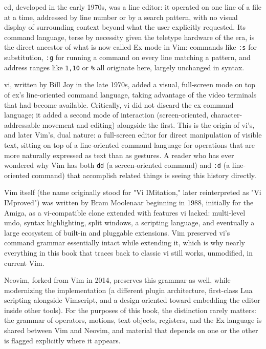 ed, developed in the early 1970s, was a line editor: it operated on one line of a file at a time, addressed by line number or by a search pattern, with no visual display of surrounding context beyond what the user explicitly requested. Its command language, terse by necessity given the teletype hardware of the era, is the direct ancestor of what is now called Ex mode in Vim: commands like \texttt{:s} for substitution, \texttt{:g} for running a command on every line matching a pattern, and address ranges like \texttt{1,10} or \texttt{\%} all originate here, largely unchanged in syntax.

vi, written by Bill Joy in the late 1970s, added a visual, full-screen mode on top of ex's line-oriented command language, taking advantage of the video terminals that had become available. Critically, vi did not discard the ex command language; it added a second mode of interaction (screen-oriented, character-addressable movement and editing) alongside the first. This is the origin of vi's, and later Vim's, dual nature: a full-screen editor for direct manipulation of visible text, sitting on top of a line-oriented command language for operations that are more naturally expressed as text than as gestures. A reader who has ever wondered why Vim has both \texttt{dd} (a screen-oriented command) and \texttt{:d} (a line-oriented command) that accomplish related things is seeing this history directly.

Vim itself (the name originally stood for "Vi IMitation," later reinterpreted as "Vi IMproved") was written by Bram Moolenaar beginning in 1988, initially for the Amiga, as a vi-compatible clone extended with features vi lacked: multi-level undo, syntax highlighting, split windows, a scripting language, and eventually a large ecosystem of built-in and pluggable extensions. Vim preserved vi's command grammar essentially intact while extending it, which is why nearly everything in this book that traces back to classic vi still works, unmodified, in current Vim.

Neovim, forked from Vim in 2014, preserves this grammar as well, while modernizing the implementation (a different plugin architecture, first-class Lua scripting alongside Vimscript, and a design oriented toward embedding the editor inside other tools). For the purposes of this book, the distinction rarely matters: the grammar of operators, motions, text objects, registers, and the Ex language is shared between Vim and Neovim, and material that depends on one or the other is flagged explicitly where it appears.

